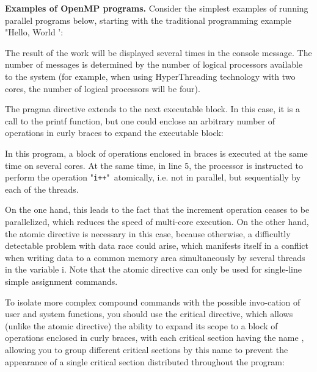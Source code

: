 {	\par\textbf{Examples of OpenMP programs.} Consider the simplest examples of running parallel programs below, starting with the traditional programming example "Hello, World ':
	\begin{figure}[H]
		
	\end{figure}
	\par The result of the work will be displayed several times in the console message. The number of messages is determined by the number of logical processors available to the system (for example, when using HyperThreading technology with two cores, the number of logical processors will be four). 
	\par The pragma directive extends to the next executable block. In this case, it is a call to the printf function, but one could enclose an arbitrary number of operations in curly braces to expand the executable block:
	\begin{figure}[H]
		
	\end{figure}
	In this program, a block of operations enclosed in braces is executed at the same time on several cores. At the same time, in line 5, the processor is instructed to perform the operation "\texttt{i++}"\ atomically, i.e. not in parallel, but sequentially by each of the threads.
	\par On the one hand, this leads to the fact that the increment operation ceases to be parallelized, which reduces the speed of multi-core execution. On the other hand, the atomic directive is necessary in this case, because otherwise, a difficultly detectable problem with data race could arise, which manifests itself in a conflict when writing data to a common memory area simultaneously by several threads in the variable i. Note that the atomic directive can only be used for single-line simple assignment commands.
	\par To isolate more complex compound commands with the possible invo-cation of user and system functions, you should use the critical directive, which allows (unlike the atomic directive) the ability to expand its scope to a block of operations enclosed in curly braces, with each critical section having the name , allowing you to group different critical sections by this name to prevent the appearance of a single critical section distributed throughout the program:
	\begin{figure}[H]
		
	\end{figure}
}
